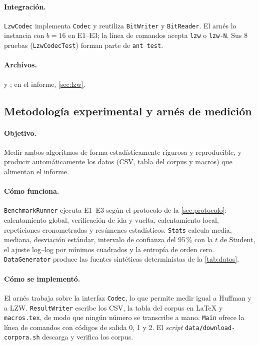 \paragraph{Integración.} \texttt{LzwCodec} implementa \texttt{Codec} y reutiliza
\texttt{BitWriter} y \texttt{BitReader}. El arnés lo instancia con $b = 16$ en E1--E3; la línea de comandos acepta \texttt{lzw} o \texttt{lzw-N}. Sus 8 pruebas
(\texttt{LzwCodecTest}) forman parte de \texttt{ant test}.

\paragraph{Archivos.}  y
; en el informe,
\cref{sec:lzw}.

\subsection{Metodología experimental y arnés de medición}
\label{app:detalle-c}
\paragraph{Objetivo.} Medir ambos algoritmos de forma estadísticamente rigurosa y
reproducible, y producir automáticamente los datos (CSV, tabla del corpus y macros) que
alimentan el informe.

\paragraph{Cómo funciona.} \texttt{BenchmarkRunner} ejecuta E1--E3 según el protocolo de la
\cref{sec:protocolo}: calentamiento global, verificación de ida y vuelta, calentamiento local,
repeticiones cronometradas y resúmenes estadísticos. \texttt{Stats} calcula media, mediana,
desviación estándar, intervalo de confianza del 95\,\% con la $t$ de Student, el ajuste
log--log por mínimos cuadrados y la entropía de orden cero. \texttt{DataGenerator} produce las
fuentes sintéticas deterministas de la \cref{tab:datos}.

\paragraph{Cómo se implementó.} El arnés trabaja sobre la interfaz \texttt{Codec}, lo que
permite medir igual a Huffman y a LZW. \texttt{ResultWriter} escribe los CSV, la tabla del corpus en \LaTeX{} y
\texttt{macros.tex}, de modo que ningún número se transcribe a mano. \texttt{Main} ofrece la
línea de comandos con códigos de salida 0, 1 y 2. El \emph{script}
\texttt{data/download-corpora.sh} descarga y verifica los corpus.

